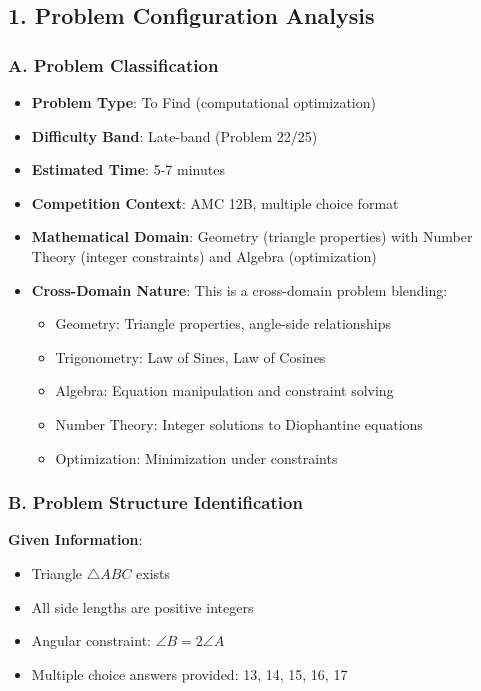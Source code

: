 \documentclass[12pt]{article}
\begin{document}
\begin{problemconfigbox}
\subsection*{1. Problem Configuration Analysis}

\subsubsection*{A. Problem Classification}

\begin{itemize}[leftmargin=*]
    \item \textbf{Problem Type}: To Find (computational optimization)
    \item \textbf{Difficulty Band}: Late-band (Problem 22/25)
    \item \textbf{Estimated Time}: 5-7 minutes
    \item \textbf{Competition Context}: AMC 12B, multiple choice format
    \item \textbf{Mathematical Domain}: Geometry (triangle properties) with Number Theory (integer constraints) and Algebra (optimization)
    \item \textbf{Cross-Domain Nature}: This is a cross-domain problem blending:
    \begin{itemize}
        \item Geometry: Triangle properties, angle-side relationships
        \item Trigonometry: Law of Sines, Law of Cosines
        \item Algebra: Equation manipulation and constraint solving
        \item Number Theory: Integer solutions to Diophantine equations
        \item Optimization: Minimization under constraints
    \end{itemize}
\end{itemize}

\subsubsection*{B. Problem Structure Identification}

\textbf{Given Information}:
\begin{itemize}
    \item Triangle $\triangle ABC$ exists
    \item All side lengths are positive integers
    \item Angular constraint: $\angle B = 2\angle A$
    \item Multiple choice answers provided: 13, 14, 15, 16, 17
\end{itemize}


\end{problemconfigbox}
\end{document}
